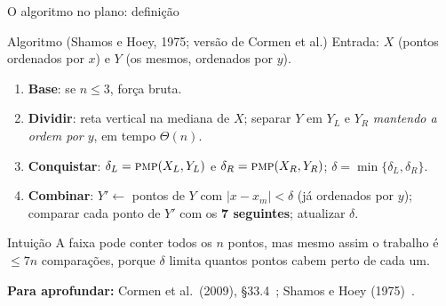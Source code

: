 \documentclass[aspectratio=169,xcolor=table]{beamer}
\newcommand{\fonte}[1]{%
  \vfill
  {\tiny\color{gray!55!black}\textbf{Para aprofundar:} #1\par}%
}
\begin{document}
\begin{frame}{O algoritmo no plano: definição}
  \begin{block}{Algoritmo (Shamos e Hoey, 1975; versão de Cormen et al.)}
    \scriptsize Entrada: $X$ (pontos ordenados por $x$) e $Y$ (os mesmos, ordenados por $y$).
    \begin{enumerate}\scriptsize
      \item \textbf{Base}: se $n\le 3$, força bruta.
      \item \textbf{Dividir}: reta vertical na mediana de $X$; separar $Y$ em $Y_L$ e $Y_R$
            \emph{mantendo a ordem por $y$}, em tempo $\Theta(n)$.
      \item \textbf{Conquistar}: $\delta_L=\textsc{pmp}(X_L,Y_L)$ e $\delta_R=\textsc{pmp}(X_R,Y_R)$;
            $\delta=\min\{\delta_L,\delta_R\}$.
      \item \textbf{Combinar}: $Y'\gets$ pontos de $Y$ com $|x-x_m|<\delta$ (já ordenados por $y$);
            comparar cada ponto de $Y'$ com os \textbf{7 seguintes}; atualizar $\delta$.
    \end{enumerate}
  \end{block}
  \begin{exampleblock}{Intuição}
    \scriptsize A faixa pode conter todos os $n$ pontos, mas mesmo assim o trabalho é
    $\le 7n$ comparações, porque $\delta$ limita quantos pontos cabem perto de cada um.
  \end{exampleblock}
  \fonte{Cormen et al.\ (2009), \S 33.4~\cite{cormen2009introduction};
    Shamos e Hoey (1975)~\cite{shamos1975closest}.}
\end{frame}
\end{document}

